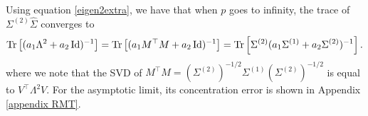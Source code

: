 Using equation \eqref{eigen2extra}, we have that when $p$ goes to infinity, the trace of $\Sigma^{(2)} \hat{\Sigma}$ converges to
\[ \operatorname{Tr}\left[(a_1 \Lambda^2 + a_2\operatorname{Id})^{-1}\right] = \operatorname{Tr}\left[(a_1 M^{\top}M + a_2 \operatorname{Id})^{-1}\right] = \operatorname{Tr}\left[\Sigma^{(2)} (a_1 \Sigma^{(1)} + a_2 \Sigma^{(2)})^{-1}\right]. \]
where we note that the SVD of $M^\top M = (\Sigma^{(2)})^{-1/2} \Sigma^{(1)} (\Sigma^{(2)})^{-1/2}$ is equal to $V^{\top}\Lambda^2 V$.
For the asymptotic limit, its concentration error is shown in Appendix \ref{appendix RMT}.

